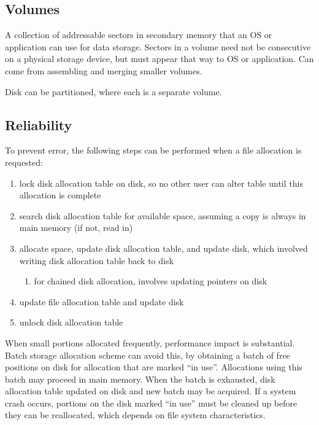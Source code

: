 \documentclass[11pt]{article}
\begin{document}
\subsection{Volumes}
\label{sec:orgec42c05}
A collection of addressable sectors in secondary memory that an OS or application can use for data
storage. Sectors in a volume need not be consecutive on a physical storage device, but must appear
that way to OS or application.
Can come from assembling and merging smaller volumes.

Disk can be partitioned, where each is a separate volume.
\subsection{Reliability}
\label{sec:org587aa9e}
To prevent error, the following steps can be performed when a file allocation is requested:
\begin{enumerate}
\item lock disk allocation table on disk, so no other user can alter table until this allocation
is complete
\item search disk allocation table for available space, assuming a copy is always in main memory (if not,
read in)
\item allocate space, update disk allocation table, and update disk, which involved writing disk
allocation table back to disk
\begin{enumerate}
\item for chained disk allocation, involves updating pointers on disk
\end{enumerate}
\item update file allocation table and update disk
\item unlock disk allocation table
\end{enumerate}

When small portions allocated frequently, performance impact is substantial.
Batch storage allocation scheme can avoid this, by obtaining a batch of free positions on disk for
allocation that are marked ``in use''.
Allocations using this batch may proceed in main memory.
When the batch is exhausted, disk allocation table updated on disk and new batch may be acquired.
If a system crash occurs, portions on the disk marked ``in use'' must be cleaned up before they can be
reallocated, which depends on file system characteristics.
\end{document}

